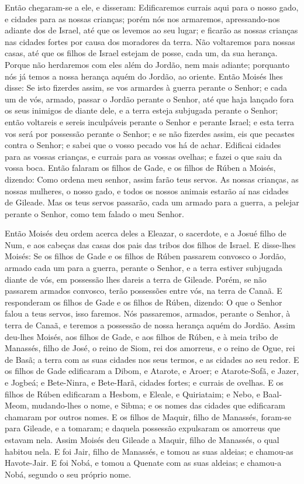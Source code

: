 Então chegaram-se a ele, e disseram: Edificaremos currais aqui
para o nosso gado, e cidades para as nossas crianças; porém
nós nos armaremos, apressando-nos adiante dos de Israel, até que os
levemos ao seu lugar; e ficarão as nossas crianças nas cidades
fortes por causa dos moradores da terra. Não voltaremos para
nossas casas, até que os filhos de Israel estejam de posse, cada um,
da sua herança. Porque não herdaremos com eles além do
Jordão, nem mais adiante; porquanto nós já temos a nossa herança
aquém do Jordão, ao oriente. Então Moisés lhes disse: Se isto
fizerdes assim, se vos armardes à guerra perante o Senhor; e
cada um de vós, armado, passar o Jordão perante o Senhor, até que
haja lançado fora os seus inimigos de diante dele, e a terra
esteja subjugada perante o Senhor; então voltareis e sereis
inculpáveis perante o Senhor e perante Israel; e esta terra vos será
por possessão perante o Senhor; e se não fizerdes assim, eis
que pecastes contra o Senhor; e sabei que o vosso pecado vos há de
achar. Edificai cidades para as vossas crianças, e currais
para as vossas ovelhas; e fazei o que saiu da vossa boca.
Então falaram os filhos de Gade, e os filhos de Rúben a
Moisés, dizendo: Como ordena meu senhor, assim farão teus servos.
As nossas crianças, as nossas mulheres, o nosso gado, e todos
os nossos animais estarão aí nas cidades de Gileade. Mas os
teus servos passarão, cada um armado para a guerra, a pelejar
perante o Senhor, como tem falado o meu Senhor.

Então Moisés deu ordem acerca deles a Eleazar, o sacerdote, e a
Josué filho de Num, e aos cabeças das casas dos pais das tribos dos
filhos de Israel. E disse-lhes Moisés: Se os filhos de Gade e
os filhos de Rúben passarem convosco o Jordão, armado cada um para a
guerra, perante o Senhor, e a terra estiver subjugada diante de vós,
em possessão lhes dareis a terra de Gileade. Porém, se não
passarem armados convosco, terão possessões entre vós, na terra de
Canaã. E responderam os filhos de Gade e os filhos de Rúben,
dizendo: O que o Senhor falou a teus servos, isso faremos.
Nós passaremos, armados, perante o Senhor, à terra de Canaã,
e teremos a possessão de nossa herança aquém do Jordão. Assim
deu-lhes Moisés, aos filhos de Gade, e aos filhos de Rúben, e à meia
tribo de Manassés, filho de José, o reino de Siom, rei dos amorreus,
e o reino de Ogue, rei de Basã; a terra com as suas cidades nos seus
termos, e as cidades ao seu redor. E os filhos de Gade
edificaram a Dibom, e Atarote, e Aroer; e Atarote-Sofã, e
Jazer, e Jogbeá; e Bete-Ninra, e Bete-Harã, cidades fortes; e
currais de ovelhas. E os filhos de Rúben edificaram a Hesbom,
e Eleale, e Quiriataim; e Nebo, e Baal-Meom, mudando-lhes o
nome, e Sibma; e os nomes das cidades que edificaram chamaram por
outros nomes. E os filhos de Maquir, filho de Manassés,
foram-se para Gileade, e a tomaram; e daquela possessão expulsaram
os amorreus que estavam nela. Assim Moisés deu Gileade a
Maquir, filho de Manassés, o qual habitou nela. E foi Jair,
filho de Manassés, e tomou as suas aldeias; e chamou-as Havote-Jair.
E foi Nobá, e tomou a Quenate com as suas aldeias; e chamou-a
Nobá, segundo o seu próprio nome.

